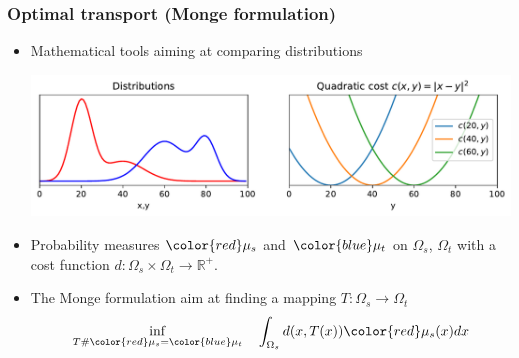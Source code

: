 \documentclass[french,9pt]{beamer}
\newcommand{\red}[1]{{\color{red} #1}}
\newcommand{\blue}[1]{{\color{blue} #1}}
\begin{document}


\begin{frame}
  \frametitle{Optimal transport (Monge formulation)}

  \begin{itemize}
  \item Mathematical tools aiming at comparing distributions
    \begin{center}
\includegraphics[width=0.9\linewidth]{./fig/dist_monge.pdf}  
\end{center}

  \item Probability measures $\red{\mu_s}$ and $\blue{\mu_{t}}$ on $\Omega_s$, $\Omega_t$    
    with a cost function
    $d: \Omega_{s} \times \Omega_{t} \rightarrow \mathbb{R}^{+}$.

  \item The Monge formulation aim at finding a mapping
    $T:\Omega_{s}\rightarrow \Omega_{t}$
    \begin{equation}
      \label{eq:1}
      \inf_{T\#\red{\mu_{s}}=\blue{\mu_{t}}}\quad\int_{\Omega_{s}} d(x,T(x))\red{\mu_{s}}(x)dx
    \end{equation}

  \end{itemize}
  

\end{frame}
\end{document}
